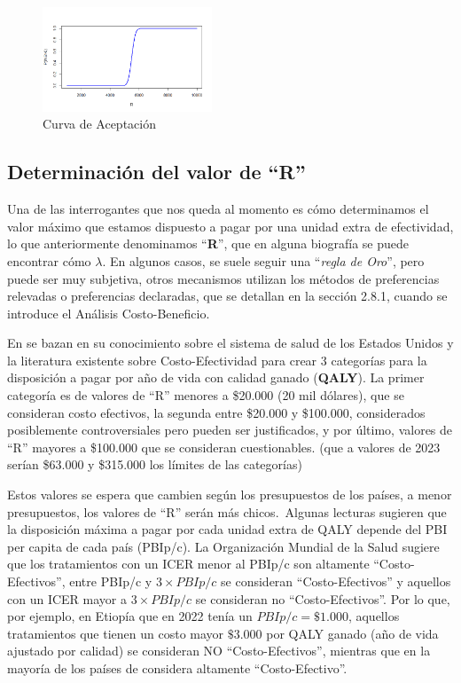 \documentclass{siep}
\begin{document}
\begin{figure}[htbp]
	\centering
	\includegraphics[width=0.45\textwidth]{grafi/Curva_acept.jpg}
	\caption{Curva de Aceptación}
	\label{fig:2}
\end{figure}

\subsection{Determinación del valor de ``R''}
\label{sec:DVR}

Una de las interrogantes que nos queda al momento es cómo determinamos el valor máximo que estamos dispuesto a pagar por una unidad extra de efectividad, lo que anteriormente denominamos ``\textbf{R}'', que en alguna biografía se puede encontrar cómo $\lambda$. En algunos casos, se suele seguir una ``\textit{regla de Oro}'', pero puede ser muy subjetiva, otros mecanismos utilizan los métodos de preferencias relevadas o preferencias declaradas, que se detallan en la sección 2.8.1, cuando se introduce el Análisis Costo-Beneficio.\

En \cite{kaplan_health-related_1982} se bazan en su conocimiento sobre el sistema de salud de los Estados Unidos y la literatura existente sobre Costo-Efectividad para crear 3 categorías para la disposición a pagar por año de vida con calidad ganado (\textbf{QALY}). La primer categoría es de valores de ``R'' menores a \$20.000 (20 mil dólares), que se consideran costo efectivos, la segunda entre \$20.000 y \$100.000, considerados posiblemente controversiales pero pueden ser justificados, y por último, valores de ``R'' mayores a \$100.000 que se consideran cuestionables. (que a valores de 2023 serían \$63.000 y \$315.000 los límites de las categorías)\


Estos valores se espera que cambien según los presupuestos de los países, a menor presupuestos, los valores de ``R'' serán más chicos.\
Algunas lecturas sugieren que la disposición máxima a pagar por cada unidad extra de QALY depende del PBI per capita de cada país (PBIp/c). La Organización Mundial de la Salud sugiere que los tratamientos con un ICER menor al PBIp/c son altamente ``Costo-Efectivos'', entre PBIp/c y $3\times PBIp/c$ se consideran ``Costo-Efectivos'' y aquellos con un ICER mayor a $3\times PBIp/c$ se consideran no ``Costo-Efectivos''.
Por lo que, por ejemplo, en Etiopía que en 2022 tenía un $PBIp/c = \$1.000$, aquellos tratamientos que tienen un costo mayor $\$3.000$ por QALY ganado (año de vida ajustado por calidad) se consideran NO ``Costo-Efectivos'', mientras que en la mayoría de los países de considera altamente ``Costo-Efectivo''. 
\end{document}
